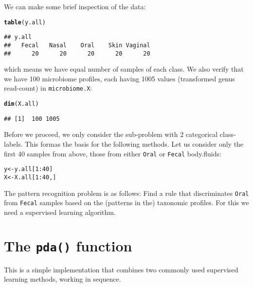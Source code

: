 \documentclass[a4paper]{article}\usepackage[]{graphicx}\usepackage[]{color}
\makeatletter
\newcommand{\hlnum}[1]{\textcolor[rgb]{0.686,0.059,0.569}{#1}}%
\newcommand{\hlopt}[1]{\textcolor[rgb]{0,0,0}{#1}}%
\newcommand{\hlstd}[1]{\textcolor[rgb]{0.345,0.345,0.345}{#1}}%
\newcommand{\hlkwb}[1]{\textcolor[rgb]{0.69,0.353,0.396}{#1}}%
\newcommand{\hlkwd}[1]{\textcolor[rgb]{0.737,0.353,0.396}{\textbf{#1}}}%
\newenvironment{kframe}{%
 \def\at@end@of@kframe{}%
 \ifinner\ifhmode%
  \def\at@end@of@kframe{\end{minipage}}%
  \begin{minipage}{\columnwidth}%
 \fi\fi%
 \def\FrameCommand##1{\hskip\@totalleftmargin \hskip-\fboxsep
 \colorbox{shadecolor}{##1}\hskip-\fboxsep
     \hskip-\linewidth \hskip-\@totalleftmargin \hskip\columnwidth}%
 \MakeFramed {\advance\hsize-\width
   \@totalleftmargin\z@ \linewidth\hsize
   \@setminipage}}%
 {\par\unskip\endMakeFramed%
 \at@end@of@kframe}
\newenvironment{knitrout}{}{} %
\makeatother
\begin{document}
We can make some brief inspection of the data:
\begin{knitrout}
\color{fgcolor}\begin{kframe}
\begin{alltt}
\hlkwd{table}\hlstd{(y.all)}
\end{alltt}
\begin{verbatim}
## y.all
##   Fecal   Nasal    Oral    Skin Vaginal 
##      20      20      20      20      20
\end{verbatim}
\end{kframe}
\end{knitrout}
which means we have equal number of samples of each class. We also verify that we have 100 microbiome profiles, each having 1005 values (transformed genus read-count) in \texttt{microbiome.X}:
\begin{knitrout}
\color{fgcolor}\begin{kframe}
\begin{alltt}
\hlkwd{dim}\hlstd{(X.all)}
\end{alltt}
\begin{verbatim}
## [1]  100 1005
\end{verbatim}
\end{kframe}
\end{knitrout}

Before we proceed, we only consider the sub-problem with 2 categorical class-labels. This formas the basis for the following methods. Let us consider only the first 40 samples from above, those from either \texttt{Oral} or \texttt{Fecal} body.fluids:
\begin{knitrout}
\color{fgcolor}\begin{kframe}
\begin{alltt}
\hlstd{y} \hlkwb{<-} \hlstd{y.all[}\hlnum{1}\hlopt{:}\hlnum{40}\hlstd{]}
\hlstd{X} \hlkwb{<-} \hlstd{X.all[}\hlnum{1}\hlopt{:}\hlnum{40}\hlstd{,]}
\end{alltt}
\end{kframe}
\end{knitrout}
The pattern recognition problem is as follows: Find a rule that discriminates \texttt{Oral} from \texttt{Fecal}  samples based on the (patterns in the) taxonomic profiles. For this we need a supervised learning algorithm.


\section{The \texttt{pda()} function}
This is a simple implementation that combines two commonly used supervised learning methods, working in sequence.
\end{document}
